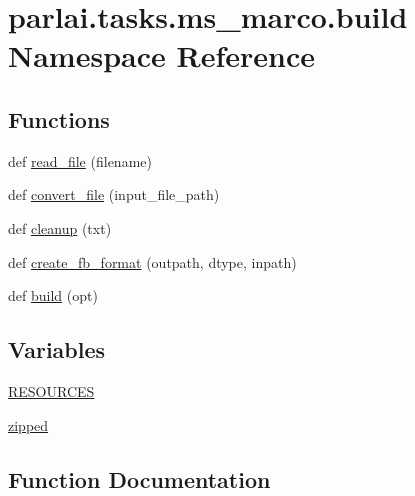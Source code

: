 \hypertarget{namespaceparlai_1_1tasks_1_1ms__marco_1_1build}{}\section{parlai.\+tasks.\+ms\+\_\+marco.\+build Namespace Reference}
\label{namespaceparlai_1_1tasks_1_1ms__marco_1_1build}
\subsection*{Functions}
\begin{DoxyCompactItemize}
\item 
def \hyperlink{namespaceparlai_1_1tasks_1_1ms__marco_1_1build_a8e7fee7824a3a7aa1facadf9979f3f4a}{read\+\_\+file} (filename)
\item 
def \hyperlink{namespaceparlai_1_1tasks_1_1ms__marco_1_1build_ac19db5d0ad4ba8559f6aca64f2fe192b}{convert\+\_\+file} (input\+\_\+file\+\_\+path)
\item 
def \hyperlink{namespaceparlai_1_1tasks_1_1ms__marco_1_1build_a6c94ade2f99fa70bf4103a22a1fbdc42}{cleanup} (txt)
\item 
def \hyperlink{namespaceparlai_1_1tasks_1_1ms__marco_1_1build_ac3cdd4cc2ccd3e9551ddd0349b94d537}{create\+\_\+fb\+\_\+format} (outpath, dtype, inpath)
\item 
def \hyperlink{namespaceparlai_1_1tasks_1_1ms__marco_1_1build_a3516057a3812247cdb1b1c9e8f6cb84d}{build} (opt)
\end{DoxyCompactItemize}
\subsection*{Variables}
\begin{DoxyCompactItemize}
\item 
\hyperlink{namespaceparlai_1_1tasks_1_1ms__marco_1_1build_af344d1660233d915e9e6efa8ceccb22b}{R\+E\+S\+O\+U\+R\+C\+ES}
\item 
\hyperlink{namespaceparlai_1_1tasks_1_1ms__marco_1_1build_aa59139a792f73cbb243b98278c6b753e}{zipped}
\end{DoxyCompactItemize}


\subsection{Function Documentation}
\mbox{\label{namespaceparlai_1_1tasks_1_1ms__marco_1_1build_a3516057a3812247cdb1b1c9e8f6cb84d}} 
